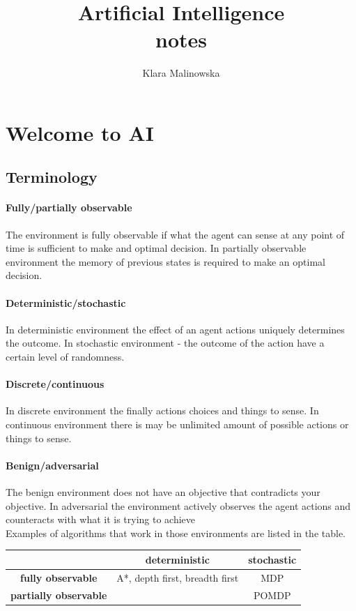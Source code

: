 \documentclass[a4paper,10pt]{article}
\title{Artificial Intelligence \\ notes}
\author{Klara Malinowska}
\begin{document}
\maketitle

\tableofcontents
\newpage

\section{Welcome to AI}
\subsection{Terminology}

\paragraph{Fully/partially observable}
The environment is fully observable if what the agent can sense at any point of time is sufficient to make and optimal decision. In partially observable environment the memory of previous states is required to make an optimal decision.

\paragraph{Deterministic/stochastic}
In deterministic environment the effect of an agent actions uniquely determines the outcome. In stochastic environment - the outcome of the action have a certain level of randomness.

\paragraph{Discrete/continuous}
In discrete environment the finally actions choices and things to sense. In continuous environment there is may be unlimited amount of possible actions or things to sense.

\paragraph{Benign/adversarial}
The benign environment does not have an objective that contradicts your objective. In adversarial the environment actively observes the agent actions and counteracts with what it is trying to achieve \\[1em]
Examples of algorithms that work in those environments are listed in the table.\\[1em]

\begin{tabular}{|c|c|c|}
\hline
					& \textbf{deterministic} & \textbf{stochastic}\\ \hline
\textbf{fully observable}		& A*, depth first, breadth first 	& MDP 	\\ \hline
\textbf{partially observable}   &									& POMDP	\\ \hline
\end{tabular}
\end{document}
